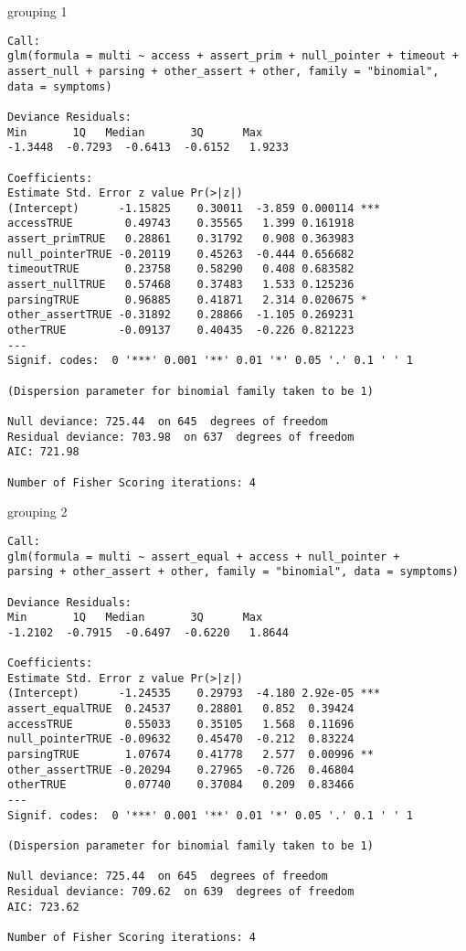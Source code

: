 grouping 1
\begin{lstlisting}[basicstyle=\tiny]
Call:
glm(formula = multi ~ access + assert_prim + null_pointer + timeout +
assert_null + parsing + other_assert + other, family = "binomial",
data = symptoms)

Deviance Residuals:
Min       1Q   Median       3Q      Max
-1.3448  -0.7293  -0.6413  -0.6152   1.9233

Coefficients:
Estimate Std. Error z value Pr(>|z|)
(Intercept)      -1.15825    0.30011  -3.859 0.000114 ***
accessTRUE        0.49743    0.35565   1.399 0.161918
assert_primTRUE   0.28861    0.31792   0.908 0.363983
null_pointerTRUE -0.20119    0.45263  -0.444 0.656682
timeoutTRUE       0.23758    0.58290   0.408 0.683582
assert_nullTRUE   0.57468    0.37483   1.533 0.125236
parsingTRUE       0.96885    0.41871   2.314 0.020675 *
other_assertTRUE -0.31892    0.28866  -1.105 0.269231
otherTRUE        -0.09137    0.40435  -0.226 0.821223
---
Signif. codes:  0 '***' 0.001 '**' 0.01 '*' 0.05 '.' 0.1 ' ' 1

(Dispersion parameter for binomial family taken to be 1)

Null deviance: 725.44  on 645  degrees of freedom
Residual deviance: 703.98  on 637  degrees of freedom
AIC: 721.98

Number of Fisher Scoring iterations: 4
\end{lstlisting}

grouping 2
\begin{lstlisting}[basicstyle=\tiny]
Call:
glm(formula = multi ~ assert_equal + access + null_pointer +
parsing + other_assert + other, family = "binomial", data = symptoms)

Deviance Residuals:
Min       1Q   Median       3Q      Max
-1.2102  -0.7915  -0.6497  -0.6220   1.8644

Coefficients:
Estimate Std. Error z value Pr(>|z|)
(Intercept)      -1.24535    0.29793  -4.180 2.92e-05 ***
assert_equalTRUE  0.24537    0.28801   0.852  0.39424
accessTRUE        0.55033    0.35105   1.568  0.11696
null_pointerTRUE -0.09632    0.45470  -0.212  0.83224
parsingTRUE       1.07674    0.41778   2.577  0.00996 **
other_assertTRUE -0.20294    0.27965  -0.726  0.46804
otherTRUE         0.07740    0.37084   0.209  0.83466
---
Signif. codes:  0 '***' 0.001 '**' 0.01 '*' 0.05 '.' 0.1 ' ' 1

(Dispersion parameter for binomial family taken to be 1)

Null deviance: 725.44  on 645  degrees of freedom
Residual deviance: 709.62  on 639  degrees of freedom
AIC: 723.62

Number of Fisher Scoring iterations: 4
\end{lstlisting}

